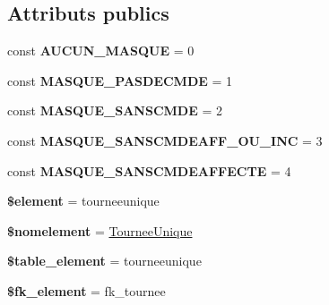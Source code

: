 \subsection*{Attributs publics}
\begin{DoxyCompactItemize}
\item 
\mbox{\label{classTourneeUnique_a5b1d3deaff923d16d8c8462af7ce6ef5}} 
const {\bfseries A\+U\+C\+U\+N\+\_\+\+M\+A\+S\+Q\+UE} = 0
\item 
\mbox{\label{classTourneeUnique_ab87f56e5dc7f8821d0e012f7eae2584d}} 
const {\bfseries M\+A\+S\+Q\+U\+E\+\_\+\+P\+A\+S\+D\+E\+C\+M\+DE} = 1
\item 
\mbox{\label{classTourneeUnique_a31399d0877fc2f4bcc08291f7fb533d5}} 
const {\bfseries M\+A\+S\+Q\+U\+E\+\_\+\+S\+A\+N\+S\+C\+M\+DE} = 2
\item 
\mbox{\label{classTourneeUnique_a9bbb8735216a95f6794eb07ccc7f5b7e}} 
const {\bfseries M\+A\+S\+Q\+U\+E\+\_\+\+S\+A\+N\+S\+C\+M\+D\+E\+A\+F\+F\+\_\+\+O\+U\+\_\+\+I\+NC} = 3
\item 
\mbox{\label{classTourneeUnique_a2b09cd9ffd5b1dc37887e1fd06ec7633}} 
const {\bfseries M\+A\+S\+Q\+U\+E\+\_\+\+S\+A\+N\+S\+C\+M\+D\+E\+A\+F\+F\+E\+C\+TE} = 4
\item 
\mbox{\label{classTourneeUnique_aa5322bd43a019adb23c007199d9fa111}} 
{\bfseries \$element} = \textquotesingle{}tourneeunique\textquotesingle{}
\item 
\mbox{\label{classTourneeUnique_a7aeffffbe0f6f5932837f9617c914003}} 
{\bfseries \$nomelement} = \textquotesingle{}\hyperlink{classTourneeUnique}{Tournee\+Unique}\textquotesingle{}
\item 
\mbox{\label{classTourneeUnique_a3a064db5c79f03318eb953d349ac480f}} 
{\bfseries \$table\+\_\+element} = \textquotesingle{}tourneeunique\textquotesingle{}
\item 
\mbox{\label{classTourneeUnique_ac3986195a2c3b09b13b8c88715804815}} 
{\bfseries \$fk\+\_\+element} = \textquotesingle{}fk\+\_\+tournee\textquotesingle{}

\end{DoxyCompactItemize}

